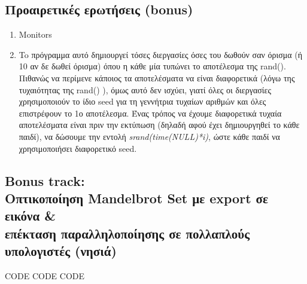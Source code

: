\documentclass[a4paper,10pt]{article} \usepackage{anysize}
\begin{document}
\subsection{Προαιρετικές ερωτήσεις (bonus)} 

\begin{enumerate}
\item Monitors

\item To πρόγραμμα αυτό δημιουργεί τόσες διεργασίες όσες του δωθούν σαν όρισμα (ή 10 αν δε δωθεί όρισμα) όπου η κάθε μία τυπώνει το αποτέλεσμα 
της rand(). Πιθανώς να περίμενε κάποιος τα αποτελέσματα να είναι διαφορετικά (λόγω της τυχαιότητας της rand() ), όμως αυτό δεν ισχύει, γιατί όλες οι διεργασίες χρησιμοποιούν το ίδιο seed για τη γεννήτρια τυχαίων αριθμών και όλες επιστρέφουν το 1ο αποτέλεσμα.
Ένας τρόπος να έχουμε διαφορετικά τυχαία αποτελέσματα είναι πριν την εκτύπωση (δηλαδή αφού έχει δημιουργηθεί το κάθε παιδί), να δώσουμε την εντολή 
\emph{srand(time(NULL)*i)}, ώστε κάθε παιδί να χρησιμοποιήσει διαφορετικό seed.   
\end{enumerate}

\subsection{Bonus track: \\Οπτικοποίηση Mandelbrot Set με export σε εικόνα \& \\επέκταση παραλληλοποίησης σε πολλαπλούς υπολογιστές (νησιά)}
CODE CODE CODE
\end{document}
